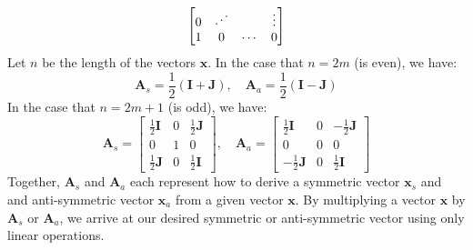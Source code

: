 \begin{enumerate}[label=(\alph*)]
\begin{tcolorbox}
$$\begin{bmatrix}
				      0      & \reflectbox{$\ddots$} &                       & \vdots \\
				      1      & 0                     & \cdots                & 0
			      \end{bmatrix}
		      $$
		      Let $n$ be the length of the vectors $\mathbf{x}$. In the case that
		      $n = 2m$ (is even), we have:
		      $$
			      \mathbf{A}_s = \frac{1}{2} \left( \mathbf{I} + \mathbf{J} \right), \quad
			      \mathbf{A}_a = \frac{1}{2} \left( \mathbf{I} - \mathbf{J} \right)
		      $$
		      In the case that $n = 2m  + 1$ (is odd), we have:
		      $$
			      \mathbf{A}_s =
			      \begin{bmatrix}
				      \frac{1}{2} \mathbf{I} & 0 & \frac{1}{2} \mathbf{J} \\
				      0                      & 1 & 0                      \\
				      \frac{1}{2} \mathbf{J} & 0 & \frac{1}{2} \mathbf{I}
			      \end{bmatrix}, \quad
			      \mathbf{A}_a =
			      \begin{bmatrix}
				      \frac{1}{2} \mathbf{I}  & 0 & -\frac{1}{2} \mathbf{J} \\
				      0                       & 0 & 0                       \\
				      -\frac{1}{2} \mathbf{J} & 0 & \frac{1}{2} \mathbf{I}
			      \end{bmatrix}
		      $$
		      Together, $\mathbf{A}_s$ and $\mathbf{A}_a$ each represent how to
		      derive a symmetric vector $\mathbf{x}_s$ and and anti-symmetric vector
		      $\mathbf{x}_a$ from a given vector $\mathbf{x}$. By multiplying a
		      vector $\mathbf{x}$ by $\mathbf{A}_s$ or $\mathbf{A}_a$, we arrive
		      at our desired symmetric or anti-symmetric vector using only
		      linear operations.
	      \end{tcolorbox}
\end{enumerate}
